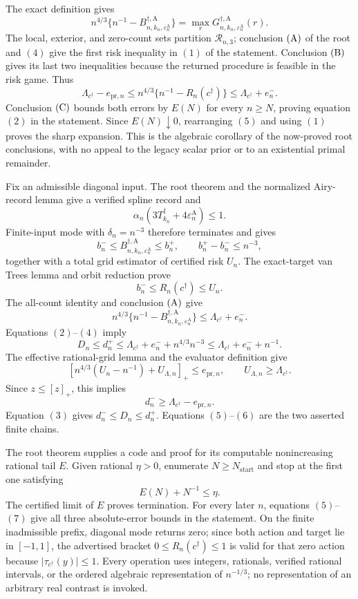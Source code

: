 The exact definition gives
\[
n^{4/3}\{n^{-1}-B_{n,k_n,\varepsilon_n^{\mathrm A}}^{\dagger,\mathrm A}\}
=\max_rG_{n,k_n,\varepsilon_n^{\mathrm A}}^{\dagger,\mathrm A}(r).
\tag{4}
\]
The local, exterior, and zero-count sets partition \(\mathcal R_{n,3}\); conclusion \({\rm(A)}\) of the root and \((4)\) give the first risk inequality in \((1)\) of the statement.  Conclusion \({\rm(B)}\) gives its last two inequalities because the returned procedure is feasible in the risk game.  Thus
\[
\Lambda_{c^\dagger}-e_{\mathrm{pr},n}
\le n^{4/3}\{n^{-1}-R_n(c^\dagger)\}
\le\Lambda_{c^\dagger}+e_n^-.
\tag{5}
\]
Conclusion \({\rm(C)}\) bounds both errors by \(E(N)\) for every \(n\ge N\), proving equation \((2)\) in the statement.  Since \(E(N)\downarrow0\), rearranging \((5)\) and using \((1)\) proves the sharp expansion.  This is the algebraic corollary of the now-proved root conclusions, with no appeal to the legacy scalar prior or to an existential primal remainder.

Fix an admissible diagonal input.  The root theorem and the normalized Airy-record lemma give a verified spline record and
\[
\alpha_n(3T_{k_n}^\dagger+4\varepsilon_n^{\mathrm A})\le1.
\tag{1}
\]
Finite-input mode with \(\delta_n=n^{-3}\) therefore terminates and gives
\[
b_n^-\le B_{n,k_n,\varepsilon_n^{\mathrm A}}^{\dagger,\mathrm A}
\le b_n^+,\qquad b_n^+-b_n^-\le n^{-3},
\tag{2}
\]
together with a total grid estimator of certified risk \(U_n\).  The exact-target van Trees lemma and orbit reduction prove
\[
b_n^-\le R_n(c^\dagger)\le U_n.
\tag{3}
\]
The all-count identity and conclusion \({\rm(A)}\) give
\[
n^{4/3}\{n^{-1}-B_{n,k_n,\varepsilon_n^{\mathrm A}}^{\dagger,\mathrm A}\}
\le\Lambda_{c^\dagger}+e_n^-.
\tag{4}
\]
Equations \((2)\)--\((4)\) imply
\[
D_n\le d_n^+\le\Lambda_{c^\dagger}+e_n^-+n^{4/3}n^{-3}
\le\Lambda_{c^\dagger}+e_n^-+n^{-1}.
\tag{5}
\]
The effective rational-grid lemma and the evaluator definition give
\[
\left[n^{4/3}(U_n-n^{-1})+U_{\Lambda,n}\right]_+
\le e_{\mathrm{pr},n},\qquad U_{\Lambda,n}\ge\Lambda_{c^\dagger}.
\]
Since \(z\le[z]_+\), this implies
\[
d_n^-\ge\Lambda_{c^\dagger}-e_{\mathrm{pr},n}.
\tag{6}
\]
Equation \((3)\) gives \(d_n^-\le D_n\le d_n^+\).  Equations \((5)\)--\((6)\) are the two asserted finite chains.

The root theorem supplies a code and proof for its computable nonincreasing rational tail \(E\).  Given rational \(\eta>0\), enumerate
\(N\ge N_{\mathrm{start}}\) and stop at the first one satisfying
\[
E(N)+N^{-1}\le\eta.
\tag{7}
\]
The certified limit of \(E\) proves termination.  For every later \(n\), equations \((5)\)--\((7)\) give all three absolute-error bounds in the statement.  On the finite inadmissible prefix, diagonal mode returns zero; since both action and target lie in \([-1,1]\), the advertised bracket
\(0\le R_n(c^\dagger)\le1\) is valid for that zero action because
\(|\tau_{c^\dagger}(y)|\le1\).  Every operation uses integers, rationals, verified rational intervals, or the ordered algebraic representation of \(n^{-1/3}\); no representation of an arbitrary real contrast is invoked.

